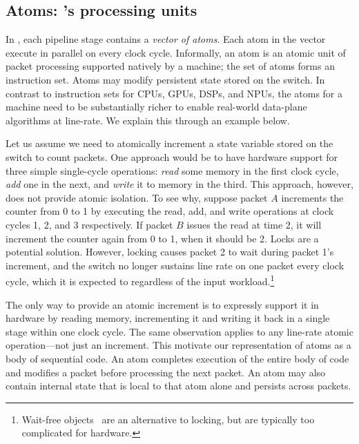 \subsection{Atoms: \absmachine's processing units}
\label{ss:atoms}

In \absmachine, each pipeline stage contains a {\em vector of
  atoms}. Each atom in the vector execute in parallel on every clock
cycle.  Informally, an atom is an atomic unit of packet processing
supported natively by a \absmachine machine; the set of atoms forms an
instruction set. Atoms may modify persistent state stored on the
switch. In contrast to instruction sets for CPUs, GPUs, DSPs, and
NPUs, the atoms for a \absmachine machine need to be substantially
richer to enable real-world data-plane algorithms at line-rate. We
explain this through an example below.

Let us assume we need to atomically increment a state variable stored
on the switch to count packets. One approach would be to have hardware
support for three simple single-cycle operations: \textit{read} some
memory in the first clock cycle, \textit{add} one in the next, and
\textit{write} it to memory in the third. This approach, however, does
not provide atomic isolation. To see why, suppose packet $A$
increments the counter from 0 to 1 by executing the read, add, and
write operations at clock cycles 1, 2, and 3 respectively.  If packet
$B$ issues the read at time 2, it will increment the counter again
from 0 to 1, when it should be 2. Locks are a potential
solution. However, locking causes packet 2 to wait during packet 1's
increment, and the switch no longer sustains line rate on one packet
every clock cycle, which it is expected to regardless of the input
workload.\footnote{Wait-free objects~\cite{herlihy_wait} are an
  alternative to locking, but are typically too complicated for
  hardware.}

The only way to provide an atomic increment is to expressly support it in
hardware by reading memory, incrementing it and writing it back in a single
stage within one clock cycle. The same observation applies to any line-rate
atomic operation---not just an increment.  This motivate our representation of
atoms as a body of sequential code. An atom completes execution of the entire
body of code and modifies a packet before processing the next packet.  An atom
may also contain internal state that is local to that atom alone and persists
across packets.


